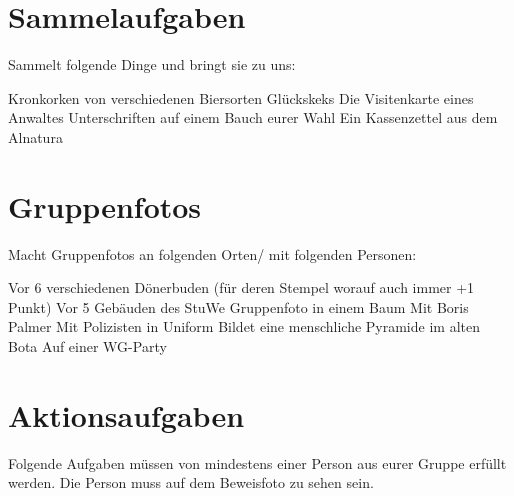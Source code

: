 \documentclass[11pt,paper=a4,answers]{exam}
\renewenvironment{questions}{
	\begin{q}
		\pointsinrightmargin
		\marginpointname{\ Pkt}
		\bracketedpoints }{
	\end{q}}
\begin{document}
\section*{Sammelaufgaben}
	Sammelt folgende Dinge und bringt sie zu uns:
	\begin{questions}
		 Kronkorken von verschiedenen Biersorten
		 Glückskeks
		\question[15] Die Visitenkarte eines Anwaltes
		 Unterschriften auf einem Bauch eurer Wahl
		\question[5] Ein Kassenzettel aus dem Alnatura
		
	\end{questions}

\section*{Gruppenfotos}
	Macht Gruppenfotos an folgenden Orten/ mit folgenden Personen:
	\begin{questions}
		\question[6+6] Vor 6 verschiedenen Dönerbuden (für deren Stempel worauf auch immer +1 Punkt)
		\question[5] Vor 5 Gebäuden des StuWe 
		\question[10] Gruppenfoto in einem Baum
		\question[100] Mit Boris Palmer
		\question[10] Mit Polizisten in Uniform
		\marginpointname{} 
		 Bildet eine menschliche Pyramide im alten Bota
		 Auf einer WG-Party
	
	\end{questions}

\section*{Aktionsaufgaben}
	Folgende Aufgaben müssen von mindestens einer Person aus eurer Gruppe erfüllt werden. Die Person muss auf dem Beweisfoto zu sehen sein.
	
\end{document}
